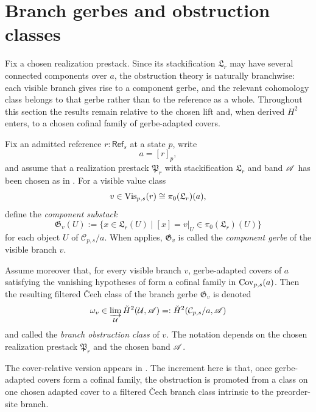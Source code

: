 \section{Branch gerbes and obstruction classes}\label{sec:gerbe-obstruction}

Fix a chosen realization prestack. Since its stackification $\mathfrak L_r$ may have several connected components over $a$, the obstruction theory is naturally branchwise: each visible branch gives rise to a component gerbe, and the relevant cohomology class belongs to that gerbe rather than to the reference as a whole. Throughout this section the results remain relative to the chosen lift and, when derived $H^2$ enters, to a chosen cofinal family of gerbe-adapted covers.

\begin{definition}\label{def:compatible-realization-stack}\label{def:cech-gluing-obstruction}
Fix an admitted reference $r:\mathsf{Ref}_s$ at a state $p$, write
\[
a=[r]_p,
\]
and assume that a realization prestack $\mathfrak P_r$ with stackification $\mathfrak L_r$ and band $\mathscr{A}$ has been chosen as in . For a visible value class
\[
v\in \mathrm{Vis}_{p,s}(r)\cong \pi_0(\mathfrak L_r)(a),
\]
define the \emph{component substack}
\[
\mathfrak G_v(U):=\{x\in \mathfrak L_r(U)\mid [x]=v|_U\in \pi_0(\mathfrak L_r)(U)\}
\]
for each object $U$ of $\mathcal C_{p,s}/a$. When  applies, $\mathfrak G_v$ is called the \emph{component gerbe} of the visible branch $v$.

Assume moreover that, for every visible branch $v$, gerbe-adapted covers of $a$ satisfying the vanishing hypotheses of  form a cofinal family in $\mathrm{Cov}_{p,s}(a)$. Then the resulting filtered \v{C}ech class of the branch gerbe $\mathfrak G_v$ is denoted
\[
\omega_v\in \varinjlim_{\mathcal U}\check{H}^2(\mathcal U,\mathscr{A})=:\check{H}^2(\mathcal C_{p,s}/a,\mathscr{A})
\]
and called the \emph{branch obstruction class} of $v$.
The notation depends on the chosen realization prestack $\mathfrak P_r$ and the chosen band $\mathscr{A}$.
\end{definition}

\begin{remark}
The cover-relative version appears in \cite[Definition~5.1]{MaZhang2026ConditionalGluingFailure}. The increment here is that, once gerbe-adapted covers form a cofinal family, the obstruction is promoted from a class on one chosen adapted cover to a filtered \v{C}ech branch class intrinsic to the preorder-site branch.
\end{remark}

